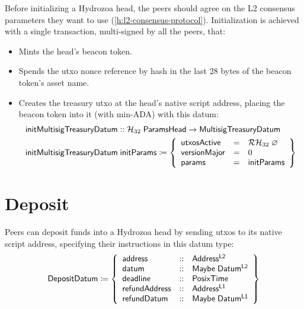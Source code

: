 \documentclass[../hydrozoa.tex]{subfiles}
\begin{document}
Before initializing a Hydrozoa head, the peers should agree on the L2 consensus parameters they want to use (\cref{h:l2-consensus-protocol}).
Initialization is achieved with a single transaction, multi-signed by all the peers, that:
\begin{itemize}
  \item Mints the head's beacon token.
  \item Spends the utxo nonce reference by hash in the last 28 bytes of the beacon token's asset name.
  \item Creates the treasury utxo at the head's native script address, placing the beacon token into it (with min-ADA) with this datum:
    \begin{equation*}
    \begin{split}
      \mathsf{initMultisigTreasuryDatum} &:: \mathcal{H}_{32} \; \mathsf{ParamsHead} -> \mathsf{MultisigTreasuryDatum} \\
      \mathsf{initMultisigTreasuryDatum} &\; \mathsf{initParams} \coloneq \left\{
        \begin{array}{lll}
          \mathsf{utxosActive} &=& \mathcal{RH}_{32} \; \varnothing \\
          \mathsf{versionMajor} &=& 0 \\
          \mathsf{params} &=& \mathsf{initParams}
        \end{array}\right\}
    \end{split}
    \end{equation*}
\end{itemize}

\section{Deposit}%
\label{h:l1-multisig-deposit}%

Peers can deposit funds into a Hydrozoa head by sending utxos to its native script address, specifying their instructions in this datum type:
\begin{equation*}
  \mathsf{DepositDatum} \coloneq \left\{
  \begin{array}{lll}
    \mathsf{address} &::& \mathsf{Address^{L2}} \\
    \mathsf{datum} &::& \mathsf{Maybe \; Datum^{L2}} \\
    \mathsf{deadline} &::& \mathsf{PosixTime} \\
    \mathsf{refundAddress} &::& \mathsf{Address^{L1}} \\
    \mathsf{refundDatum} &::& \mathsf{Maybe \; Datum^{L1}}
  \end{array}\right\}
\end{equation*}
\end{document}
